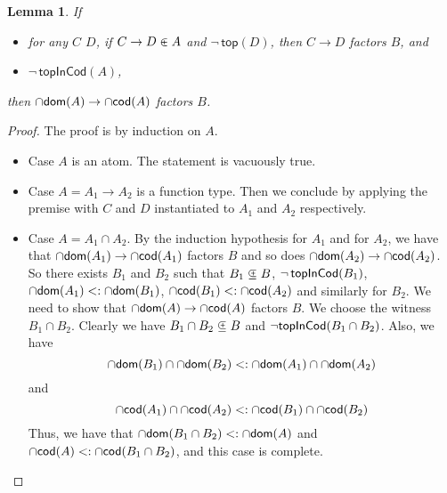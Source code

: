 \documentclass{article}
\newtheorem{lemma}[theorem]{Lemma}
\begin{document}
\begin{lemma}\label{lem:sub-inv-trans}
  If
  \begin{itemize}
  \item for any $C$ $D$, if $C \to D \inplus A$ and $\neg\,\mathsf{top}(D)$,
    then $C \to D$ factors $B$, and
  \item $\neg\, \mathsf{topInCod}(A)$,
  \end{itemize}
  then $\cap\mathsf{dom}(A) \to \cap\mathsf{cod}(A)$ factors $B$.
\end{lemma}
\begin{proof}
  The proof is by induction on $A$.
  \begin{itemize}
  \item Case $A$ is an atom. The statement is vacuously true.
  \item Case $A = A_1 \to A_2$ is a function type. Then we conclude by applying
    the premise with $C$ and $D$ instantiated to $A_1$ and $A_2$ respectively.
  \item Case $A = A_1 \cap A_2$.  By the induction hypothesis for $A_1$
    and for $A_2$, we have that $\cap\mathsf{dom}(A_1) \to \cap\mathsf{cod}(A_1)$ factors $B$
    and so does $\cap\mathsf{dom}(A_2) \to \cap\mathsf{cod}(A_2)$.  So there exists
    $B_1$ and $B_2$ such that $B_1 \subsetpluseq B$, $\neg\,\mathsf{topInCod}(B_1)$,
    $\cap\mathsf{dom}(A_1) <: \cap\mathsf{dom}(B_1)$, $\cap\mathsf{cod}(B_1) <: \cap\mathsf{cod}(A_2)$ and similarly
    for $B_2$. We need to show that $\cap\mathsf{dom}(A) \to \cap\mathsf{cod}(A)$ factors
    $B$. We choose the witness $B_1 \cap B_2$.  Clearly we have $B_1 \cap
    B_2 \subsetpluseq B$ and $\neg \mathsf{topInCod}(B_1 \cap B_2)$.  Also, we have
    \[
    \cap\mathsf{dom}(B_1) \cap \cap\mathsf{dom}(B_2) <: \cap\mathsf{dom}(A_1) \cap \cap\mathsf{dom}(A_2)
    \]
    and
    \[
    \cap\mathsf{cod}(A_1) \cap \cap\mathsf{cod}(A_2) <: \cap\mathsf{cod}(B_1) \cap \cap\mathsf{cod}(B_2)
    \]
    Thus, we have that $\cap\mathsf{dom}(B_1 \cap B_2) <: \cap\mathsf{dom}(A)$
    and $\cap\mathsf{cod}(A) <: \cap\mathsf{cod}(B_1 \cap B_2)$, and this case is complete.
  \end{itemize}
\end{proof}
\end{document}
